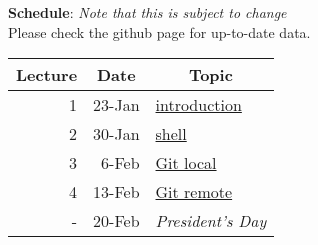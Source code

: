 \documentclass[12pt]{article}
\begin{document}
\clearpage
\noindent\textbf{Schedule}: \textit{Note that this is subject to change}\\
Please check the github page for up-to-date data.
\begin{table}[htbp]
\begin{tabular}{|r|r|l|}
\hline
\multicolumn{1}{|c|}{Lecture} & \multicolumn{1}{c|}{Date} & \multicolumn{1}{c|}{Topic} \\ \hline
1  & 23-Jan & \href{http://rachelslaybaugh.github.io/NE24/intro/#/}{introduction} \\ \hline
2  & 30-Jan & \href{http://bids.github.io/2016-01-14-berkeley/shell/}{shell} \\ \hline
3  & 6-Feb  & \href{http://bids.github.io/2016-01-14-berkeley/git/}{Git local} \\ \hline
4  & 13-Feb & \href{http://bids.github.io/2016-01-14-berkeley/git/}{Git remote} \\ \hline
-  & 20-Feb & \textit{President's Day} \\ \hline


\end{tabular}
\end{table}
\end{document}
